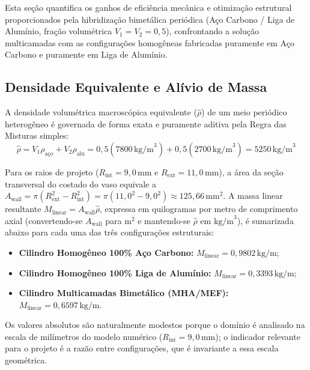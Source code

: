 Esta seção quantifica os ganhos de eficiência mecânica e otimização estrutural proporcionados pela hibridização bimetálica periódica (Aço Carbono / Liga de Alumínio, fração volumétrica $V_1 = V_2 = 0,5$), confrontando a solução multicamadas com as configurações homogêneas fabricadas puramente em Aço Carbono e puramente em Liga de Alumínio.

\subsection{Densidade Equivalente e Alívio de Massa}

A densidade volumétrica macroscópica equivalente ($\hat{\rho}$) de um meio periódico heterogêneo é governada de forma exata e puramente aditiva pela Regra das Misturas simples:
\begin{equation}
  \hat{\rho} = V_1 \rho_{\text{aço}} + V_2 \rho_{\text{alu}} = 0,5 (7800 \, \text{kg/m}^3) + 0,5 (2700 \, \text{kg/m}^3) = 5250 \, \text{kg/m}^3
  \label{eq:densidade_efetiva_sec55}
\end{equation}

Para os raios de projeto ($R_{\text{int}} = 9,0 \, \text{mm}$ e $R_{\text{ext}} = 11,0 \, \text{mm}$), a área da seção transversal do costado do vaso equivale a $A_{\text{wall}} = \pi (R_{\text{ext}}^2 - R_{\text{int}}^2) = \pi (11,0^2 - 9,0^2) \approx 125,66 \, \text{mm}^2$. A massa linear resultante $M_{\text{linear}} = A_{\text{wall}} \hat{\rho}$, expressa em quilogramas por metro de comprimento axial (convertendo-se $A_{\text{wall}}$ para $\text{m}^2$ e mantendo-se $\hat{\rho}$ em $\text{kg/m}^3$), é sumarizada abaixo para cada uma das três configurações estruturais:
\begin{itemize}
  \item \textbf{Cilindro Homogêneo 100\% Aço Carbono:} $M_{\text{linear}} = 0,9802 \, \text{kg/m}$;
  \item \textbf{Cilindro Homogêneo 100\% Liga de Alumínio:} $M_{\text{linear}} = 0,3393 \, \text{kg/m}$;
  \item \textbf{Cilindro Multicamadas Bimetálico (MHA/MEF):} $M_{\text{linear}} = 0,6597 \, \text{kg/m}$.
\end{itemize}

Os valores absolutos são naturalmente modestos porque o domínio é analisado na escala de milímetros do modelo numérico ($R_{\text{int}} = 9,0 \, \text{mm}$); o indicador relevante para o projeto é a razão entre configurações, que é invariante a essa escala geométrica.

